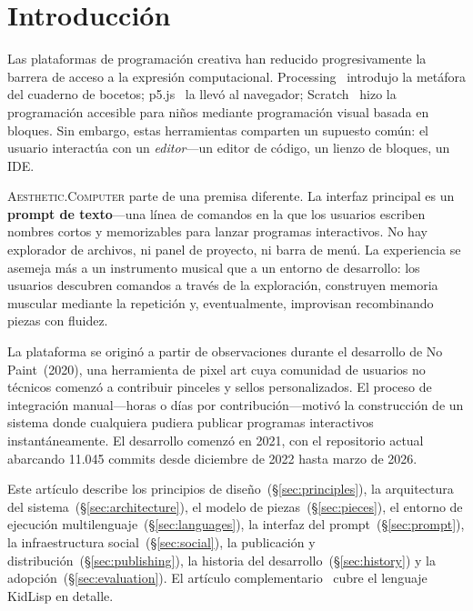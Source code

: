 \documentclass[10pt,letterpaper,twocolumn]{article}
\newcommand{\ac}{\textsc{Aesthetic.Computer}}
\begin{document}

\section{Introducción}

Las plataformas de programación creativa han reducido progresivamente la barrera de acceso a la expresión computacional. Processing~\citep{reas2007processing} introdujo la metáfora del cuaderno de bocetos; p5.js~\citep{mccarthy2015p5js} la llevó al navegador; Scratch~\citep{resnick2009scratch} hizo la programación accesible para niños mediante programación visual basada en bloques. Sin embargo, estas herramientas comparten un supuesto común: el usuario interactúa con un \emph{editor}---un editor de código, un lienzo de bloques, un IDE.

\ac{} parte de una premisa diferente. La interfaz principal es un \textbf{prompt de texto}---una línea de comandos en la que los usuarios escriben nombres cortos y memorizables para lanzar programas interactivos. No hay explorador de archivos, ni panel de proyecto, ni barra de menú. La experiencia se asemeja más a un instrumento musical que a un entorno de desarrollo: los usuarios descubren comandos a través de la exploración, construyen memoria muscular mediante la repetición y, eventualmente, improvisan recombinando piezas con fluidez.

La plataforma se originó a partir de observaciones durante el desarrollo de No Paint~(2020), una herramienta de pixel art cuya comunidad de usuarios no técnicos comenzó a contribuir pinceles y sellos personalizados. El proceso de integración manual---horas o días por contribución---motivó la construcción de un sistema donde cualquiera pudiera publicar programas interactivos instantáneamente. El desarrollo comenzó en 2021, con el repositorio actual abarcando 11.045 commits desde diciembre de 2022 hasta marzo de 2026.

Este artículo describe los principios de diseño~(\S\ref{sec:principles}), la arquitectura del sistema~(\S\ref{sec:architecture}), el modelo de piezas~(\S\ref{sec:pieces}), el entorno de ejecución multilenguaje~(\S\ref{sec:languages}), la interfaz del prompt~(\S\ref{sec:prompt}), la infraestructura social~(\S\ref{sec:social}), la publicación y distribución~(\S\ref{sec:publishing}), la historia del desarrollo~(\S\ref{sec:history}) y la adopción~(\S\ref{sec:evaluation}). El artículo complementario~\citep{scudder2026kidlisp} cubre el lenguaje KidLisp en detalle.
\end{document}
